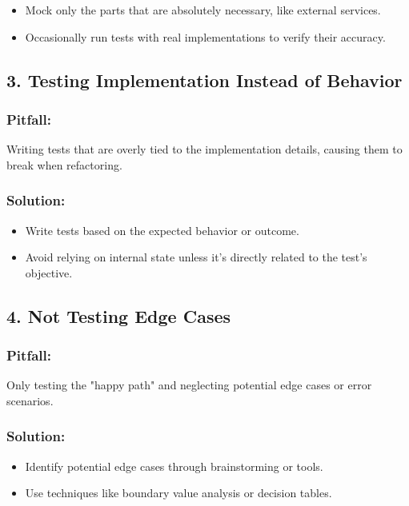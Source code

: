 \begin{itemize}
 \item Mock only the parts that are absolutely necessary, like external services.
 \item Occasionally run tests with real implementations to verify their accuracy.
\end{itemize}

\subsection*{3. Testing Implementation Instead of Behavior}

\subsubsection*{Pitfall:}

Writing tests that are overly tied to the implementation details, causing them to break when refactoring.

\subsubsection*{Solution:}

\begin{itemize}
 \item Write tests based on the expected behavior or outcome.
 \item Avoid relying on internal state unless it's directly related to the test's objective.
\end{itemize}

\subsection*{4. Not Testing Edge Cases}

\subsubsection*{Pitfall:}

Only testing the "happy path" and neglecting potential edge cases or error scenarios.

\subsubsection*{Solution:}

\begin{itemize}
 \item Identify potential edge cases through brainstorming or tools.
 \item Use techniques like boundary value analysis or decision tables.
\end{itemize}

